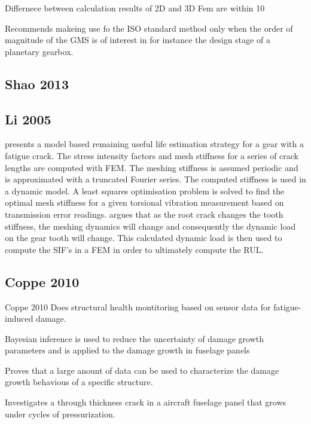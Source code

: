 Differnece between calculation results of 2D and 3D Fem are within 10%

Recommends makeing use fo the ISO standard method only when the order of magnitude of the GMS is of interest in for instance the design stage of a planetary gearbox. 


\subsection{Shao 2013}





\subsection{Li 2005}
\cite{Li2005a} presents a model based remaining useful life estimation strategy for a gear with a fatigue crack. The stress intensity factors and mesh stiffness for a series of crack lengths are computed with FEM. The meshing stiffness is assumed periodic and is approximated with a truncated Fourier series. The computed stiffness is used in a dynamic model. A least squares optimisation problem is solved to find the optimal mesh stiffness for a given torsional vibration measurement based on transmission error readings. \cite{Li2005a} argues that as the root crack changes the tooth stiffness, the meshing dynamics will change and consequently the dynamic load on the gear tooth will change. This calculated dynamic load is then used to compute the SIF's in a FEM in order to ultimately compute the RUL.




\subsection{Coppe 2010} %
Coppe 2010 Does structural health montitoring based on sensor data for fatigue-induced damage. 

Bayesian inference is used to reduce the uncertainty of damage growth parameters and is applied to the damage growth in fuselage panels

Proves that a large anount of data can be used to characterize the damage growth behavious of a specific structure.

Investigates a through thickness crack in a aircraft fuselage panel that grows under cycles of pressurization.



